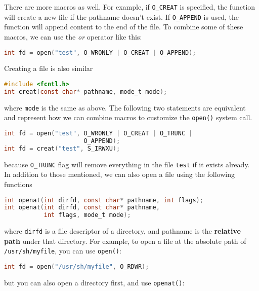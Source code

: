 \documentclass{article}
\newcommand{\bold}[1]{\textbf{#1}}
\newcommand{\code}[1]{\texttt{#1}}
\begin{document}
\noindent There are more macros as well. For example, if \code{O\_CREAT} is specified, the function will create a new file if the pathname doesn't exist. If \code{O\_APPEND} is used, the function will append content to the end of the file. To combine some of these macros, we can use the \emph{or} operator like this:

\begin{lstlisting}[language=C]
int fd = open("test", O_WRONLY | O_CREAT | O_APPEND);
\end{lstlisting}

\noindent Creating a file is also similar 

\begin{lstlisting}[language=C]
#include <fcntl.h>
int creat(const char* pathname, mode_t mode);
\end{lstlisting}

\noindent where \code{mode} is the same as above. The following two statements are equivalent and represent how we can combine macros to customize the \code{open()} system call. 

\begin{lstlisting}[language=C]
int fd = open("test", O_WRONLY | O_CREAT | O_TRUNC |
                      O_APPEND);
int fd = creat("test", S_IRWXU);
\end{lstlisting}

\noindent because \code{O\_TRUNC} flag will remove everything in the file \code{test} if it exists already. \\ 

\noindent In addition to those mentioned, we can also open a file using the following functions 

\begin{lstlisting}[language=C]
int openat(int dirfd, const char* pathname, int flags);
int openat(int dirfd, const char* pathname, 
           int flags, mode_t mode);
\end{lstlisting}

\noindent where \code{dirfd} is a file descriptor of a directory, and pathname is the \bold{relative path} under that directory. For example, to open a file at the absolute path of \code{/usr/sh/myfile}, you can use \code{open()}:

\begin{lstlisting}[language=C]
int fd = open("/usr/sh/myfile", O_RDWR);
\end{lstlisting}

\noindent but you can also open a directory first, and use \code{openat()}:
\end{document}
